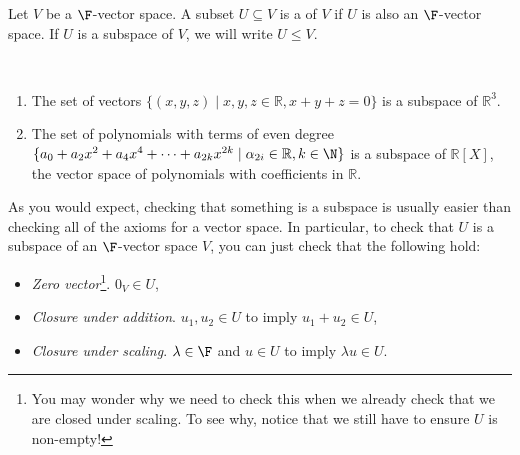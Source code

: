 \documentclass[a4paper]{scrartcl}
\begin{document}
\begin{definition}[Subspace]
    Let $V$ be a $\F$-vector space.
    A subset $U \subseteq V$ is a  of $V$ if $U$ is also an $\F$-vector space. If $U$ is a subspace of $V$, we will write $U \leq V$.
    
\end{definition}

\begin{example}~
    \vspace{-1.5\baselineskip}
    \begin{enumerate}[label=(\roman*)]
        \item The set of vectors $\{(x, y, z) \mid x, y, z \in \mathbb{R}, x + y + z = 0\}$ is a subspace of $\mathbb{R}^3$.
        \item The set of polynomials with terms of even degree $\{ a_0 + a_2 x^2 + a_4 x^4 + \cdots + a_{2k} x^{2k} \mid \alpha_{2i} \in \mathbb{R}, k \in \N\}$ is a subspace of $\mathbb{R}[X]$, the vector space of polynomials with coefficients in $\mathbb{R}$.
    \end{enumerate}
\end{example}

As you would expect, checking that something is a subspace is usually easier than checking all of the axioms for a vector space. In particular, to check that $U$ is a subspace of an $\F$-vector space $V$, you can just check that the following hold:
\begin{itemize}
    \item \emph{Zero vector}\footnote{You may wonder why we need to check this when we already check that we are closed under scaling. To see why, notice that we still have to ensure $U$ is non-empty!}. $0_V \in U$,
    \item \emph{Closure under addition}. $u_1, u_2 \in U$ to imply $u_1 + u_2 \in U$,
    \item \emph{Closure under scaling}. $\lambda \in \F$ and $u \in U$ to imply $\lambda u \in U$.
\end{itemize}
\end{document}
